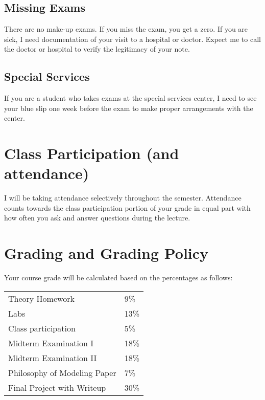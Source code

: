 \documentclass[12pt]{article}
\begin{document}
\subsection*{Missing Exams}

There are no make-up exams. If you miss the exam, you get a zero. If you are sick, I need documentation of your visit to a hospital or doctor. Expect me to call the doctor or hospital to verify the legitimacy of your note. %

\subsection*{Special Services}

If you are a student who takes exams at the special services center, I need to see your blue slip one week before the exam to make proper arrangements with the center.

\section*{Class Participation (and attendance)}

I will be taking attendance selectively throughout the semester. Attendance counts towards the class participation portion of your grade in equal part with how often you ask and answer questions during the lecture.


\section*{Grading and Grading Policy}\label{sec:grading}

Your course grade will be calculated based on the percentages as follows: 

\begin{table}[h]
\centering
\begin{tabular}{l|l}
Theory Homework & 9\% \\
Labs & 13\% \\
Class participation & 5\% \\
Midterm Examination I & 18\%\\
Midterm Examination II & 18\%\\
Philosophy of Modeling Paper & 7\% \\
Final Project with Writeup & 30\%
\end{tabular}
\end{table}
\FloatBarrier
\end{document}
